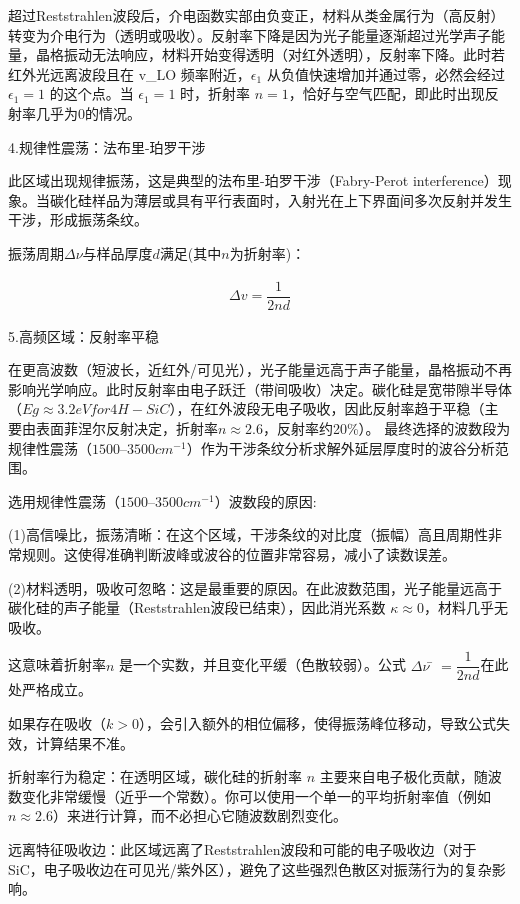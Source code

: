 \documentclass[UTF8]{ctexart}
\begin{document}
超过Reststrahlen波段后，介电函数实部由负变正，材料从类金属行为（高反射）转变为介电行为（透明或吸收）。反射率下降是因为光子能量逐渐超过光学声子能量，晶格振动无法响应，材料开始变得透明（对红外透明），反射率下降。此时若红外光远离波段且在 v\_LO 频率附近，$\epsilon_{1}$ 从负值快速增加并通过零，必然会经过 $\epsilon_{1} = 1$ 的这个点。当 $\epsilon_{1} = 1$ 时，折射率 $n = 1$，恰好与空气匹配，即此时出现反射率几乎为0的情况。\par 
4.规律性震荡：法布里-珀罗干涉\par 
此区域出现规律振荡，这是典型的法布里-珀罗干涉（Fabry-Perot interference）现象。当碳化硅样品为薄层或具有平行表面时，入射光在上下界面间多次反射并发生干涉，形成振荡条纹。\par 
振荡周期$\Delta ν$与样品厚度$d$满足(其中$n$为折射率)：\par 
\begin{align}
\Delta v=\dfrac{1}{2nd}
\end{align}\par 
5.高频区域：反射率平稳\par 
在更高波数（短波长，近红外/可见光），光子能量远高于声子能量，晶格振动不再影响光学响应。此时反射率由电子跃迁（带间吸收）决定。碳化硅是宽带隙半导体（$Eg\approx3.2 eV for 4H-SiC$），在红外波段无电子吸收，因此反射率趋于平稳（主要由表面菲涅尔反射决定，折射率$n\approx2.6$，反射率约20\%）。
最终选择的波数段为规律性震荡（$1500–3500 cm^{-1}$）作为干涉条纹分析求解外延层厚度时的波谷分析范围。\par 
选用规律性震荡（$1500–3500 cm^{-1}$）波数段的原因:\par 
(1)高信噪比，振荡清晰：在这个区域，干涉条纹的对比度（振幅）高且周期性非常规则。这使得准确判断波峰或波谷的位置非常容易，减小了读数误差。\par 
(2)材料透明，吸收可忽略：这是最重要的原因。在此波数范围，光子能量远高于碳化硅的声子能量（Reststrahlen波段已结束），因此消光系数 $κ \approx 0$，材料几乎无吸收。\par 
这意味着折射率$ n$ 是一个实数，并且变化平缓（色散较弱）。公式 $\Delta ν̄ = \dfrac{1}{2nd}$在此处严格成立。\par 
如果存在吸收（$k> 0$），会引入额外的相位偏移，使得振荡峰位移动，导致公式失效，计算结果不准。\par 
折射率行为稳定：在透明区域，碳化硅的折射率 $n$ 主要来自电子极化贡献，随波数变化非常缓慢（近乎一个常数）。你可以使用一个单一的平均折射率值（例如 $n \approx 2.6$）来进行计算，而不必担心它随波数剧烈变化。\par 
远离特征吸收边：此区域远离了Reststrahlen波段和可能的电子吸收边（对于SiC，电子吸收边在可见光/紫外区），避免了这些强烈色散区对振荡行为的复杂影响。\par 
\end{document}
